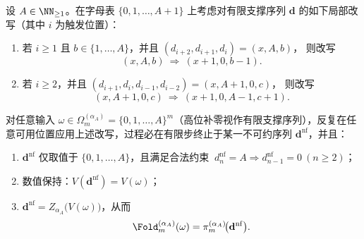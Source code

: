 \begin{theorem}[金属平均折叠的两规则规范化系统]\label{thm:ostrowski-metallic-two-rule-normalization}
设 \(A\in\NN_{\ge 1}\)。在字母表 \(\{0,1,\dots,A+1\}\) 上考虑对有限支撑序列 \(\mathbf d\) 的如下局部改写（其中 \(i\) 为触发位置）：
\begin{enumerate}
  \item 若 \(i\ge 1\) 且 \(b\in\{1,\dots,A\}\)，并且
  \(
  (d_{i+2},d_{i+1},d_i)=(x,A,b)
  \)，
  则改写
  \[
  (x,A,b)\ \Longrightarrow\ (x+1,0,b-1).
  \]
  \item 若 \(i\ge 2\)，并且
  \(
  (d_{i+1},d_i,d_{i-1},d_{i-2})=(x,A+1,0,c)
  \)，
  则改写
  \[
  (x,A+1,0,c)\ \Longrightarrow\ (x+1,0,A-1,c+1).
  \]
\end{enumerate}
对任意输入 \(\omega\in\Omega_m^{(\alpha_A)}=\{0,1,\dots,A\}^m\)（高位补零视作有限支撑序列），反复在任意可用位置应用上述改写，过程必在有限步终止于某一不可约序列 \(\mathbf d^{\mathrm{nf}}\)，并且：
\begin{enumerate}
  \item \(\mathbf d^{\mathrm{nf}}\) 仅取值于 \(\{0,1,\dots,A\}\)，且满足合法约束 \(\ d_n^{\mathrm{nf}}=A\Rightarrow d_{n-1}^{\mathrm{nf}}=0\ (n\ge 2)\)；
  \item 数值保持：\(V(\mathbf d^{\mathrm{nf}})=V(\omega)\)；
  \item \(\mathbf d^{\mathrm{nf}}=Z_{\alpha_A}\!\bigl(V(\omega)\bigr)\)，从而
  \[
  \Fold_m^{(\alpha_A)}(\omega)=\pi_m^{(\alpha_A)}\!\bigl(\mathbf d^{\mathrm{nf}}\bigr).
  \]
\end{enumerate}
\end{theorem}
